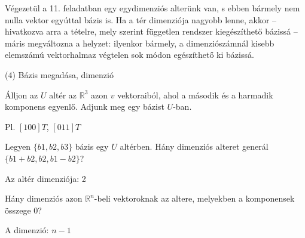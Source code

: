 \begin{frame}
\begin{tcolorbox}[title={3/11. -Q-}]
Végezetül a 11. feladatban egy egydimenziós alterünk van, s ebben bármely nem nulla vektor egyúttal bázis is. Ha a tér dimenziója nagyobb lenne, akkor – hivatkozva arra a tételre, mely szerint független rendszer kiegészíthető bázissá – máris megváltozna a helyzet: ilyenkor bármely, a dimenziószámnál kisebb elemszámú vektorhalmaz végtelen sok módon egészíthető ki bázissá.

  \end{tcolorbox}
\end{frame}



\begin{frame}[plain]
\begin{tcolorbox}[center, colback={myyellow}, coltext={black}, colframe={myyellow}]
    {\RHuge  (4) Bázis megadása, dimenzió}
    \mmedskip
\end{tcolorbox}
\end{frame}

\begin{frame}
  \begin{tcolorbox}[title={4/1. -N-}]
      Álljon az $U$ altér az $\mathbb{R}^3$ azon $v$ vektoraiból, ahol a második és a harmadik komponens egyenlő. Adjunk meg egy bázist $U$-ban.
  \tcblower

    \mmedskip 
    
    Pl. $[1 0 0]T$, $[0 1 1]T$
  \end{tcolorbox}
\end{frame}


\begin{frame}
  \begin{tcolorbox}[title={4/2. -N-}]
      Legyen $\{b1,b2,b3\}$ bázis egy $U$ altérben. Hány dimenziós alteret generál $\{b1 + b2,b2,b1 -b2\}$?
  \tcblower

    \mmedskip 
    
    Az altér dimenziója: 2
  \end{tcolorbox}
\end{frame}


\begin{frame}
  \begin{tcolorbox}[title={4/3. -R-}]
      Hány dimenziós azon $\mathbb{R}^n$-beli vektoroknak az altere, melyekben a komponensek összege $0$?
  \tcblower

    \mmedskip 
    
    A dimenzió: $n-1$
  \end{tcolorbox}
\end{frame}


